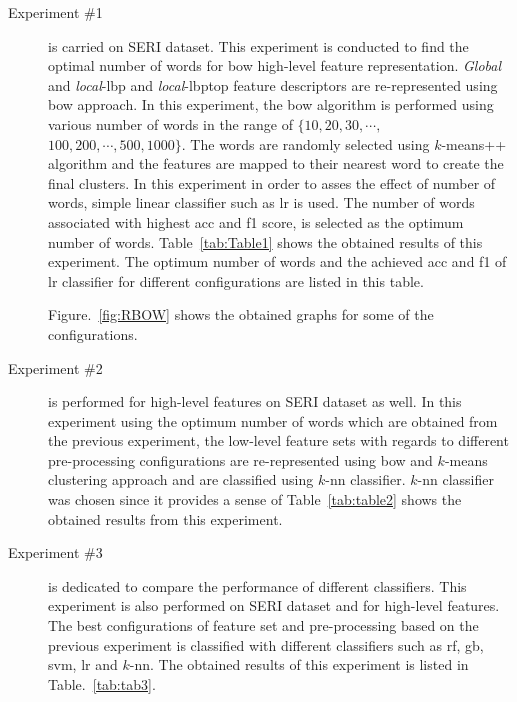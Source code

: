 \begin{description}

\item[Experiment \#1] is carried on SERI dataset.
This experiment is conducted to find the optimal number of words for \ac{bow} high-level feature representation.
\emph{Global} and \emph{local}-\ac{lbp} and \emph{local}-\ac{lbptop} feature descriptors are re-represented using \ac{bow} approach.
In this experiment, the \ac{bow} algorithm is performed using various number of words in the range of $\{10, 20, 30, \cdots,$
 $100, 200, \cdots, 500, 1000\}$.
The words are randomly selected using $k$-means++ algorithm and the features are mapped to their nearest word to create the final clusters.
In this experiment in order to asses the effect of number of words, simple linear classifier such as \ac{lr} is used.
The number of words associated with highest \ac{acc} and \ac{f1} score, is selected as the optimum number of words.
Table~\ref{tab:Table1} shows the obtained results of this experiment.
The optimum number of words and the achieved \ac{acc} and \ac{f1} of \ac{lr} classifier for different configurations are listed in this table.




Figure.~\ref{fig:RBOW} shows the obtained graphs for some of the configurations. \\




 
\item[Experiment \#2] is performed for high-level features on SERI dataset as well. 
In this experiment using the optimum number of words which are obtained from the previous experiment, the low-level feature sets with regards to different pre-processing configurations are re-represented using \ac{bow} and $k$-means clustering approach and are classified using $k$-\ac{nn} classifier.
{\color{red}$k$-\ac{nn} classifier was chosen since it provides a sense of} 
Table~\ref{tab:table2} shows the obtained results from this experiment.\\


\item[Experiment \#3] is dedicated to compare the performance of different classifiers.
This experiment is also performed on SERI dataset and for high-level features.
The {\color{red} best configurations} of feature set and pre-processing based on the previous experiment is classified with different classifiers such as \ac{rf}, \ac{gb}, \ac{svm}, \ac{lr} and $k$-\ac{nn}.
The obtained results of this experiment is listed in Table.~\ref{tab:tab3}.\\



\end{description}
